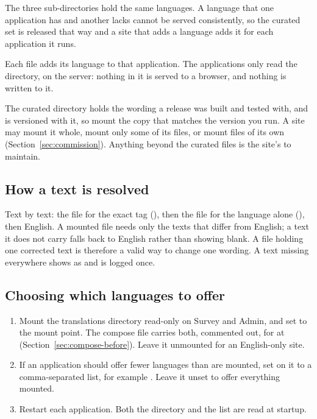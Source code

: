 \documentclass[11pt, a4paper]{article}
\begin{document}
The three sub-directories hold the same languages. A language that one application has and
another lacks cannot be served consistently, so the curated set is released that way and a site
that adds a language adds it for each application it runs.

Each  file adds its language to that application. The
applications only read the directory, on the server: nothing in it is served to a browser, and
nothing is written to it.

The curated directory holds the wording a release was built and tested with, and is versioned
with it, so mount the copy that matches the version you run. A site may mount it whole, mount
only some of its files, or mount files of its own (Section~\ref{sec:commission}). Anything
beyond the curated files is the site's to maintain.


\subsection{How a text is resolved}

Text by text: the file for the exact tag (), then the file for the language alone
(), then English. A mounted file needs only the texts that differ from English; a text
it does not carry falls back to English rather than showing blank. A file holding one corrected
text is therefore a valid way to change one wording. A text missing everywhere shows as
 and is logged once.

\subsection{Choosing which languages to offer}
\label{sec:language}

\begin{enumerate}
  \item Mount the translations directory read-only on Survey and Admin, and set
         to the mount point. The compose file carries both, commented
        out, for  at  (Section~\ref{sec:compose-before}).
        Leave it unmounted for an English-only site.
  \item If an application should offer fewer languages than are mounted, set
         on it to a comma-separated list, for example
        . Leave it unset to offer everything mounted.
  \item Restart each application. Both the directory and the list are read at startup.
\end{enumerate}
\end{document}
